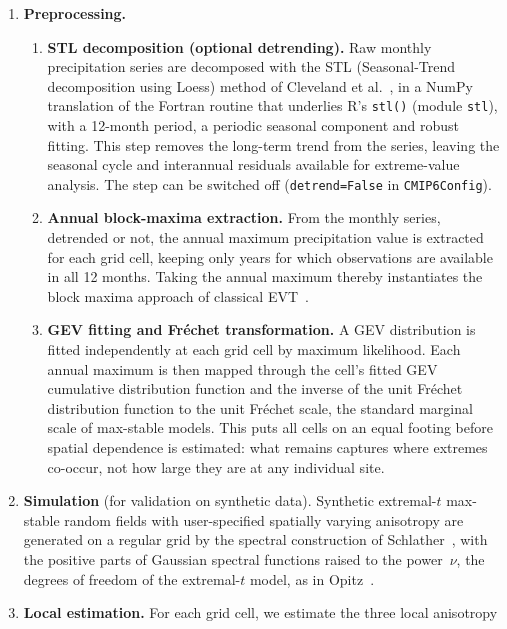 \documentclass[preprint,12pt,a4paper]{elsarticle}
\begin{document}
\begin{enumerate}
\item \textbf{Preprocessing.}
  \begin{enumerate}
  \item[\textbf{(a)}] \textbf{STL decomposition (optional detrending).}
    Raw monthly precipitation series are decomposed with the STL
    (Seasonal-Trend decomposition using Loess) method of Cleveland
    et al.~\cite{cleveland1990}, in a NumPy translation of the
    Fortran routine that underlies R's \texttt{stl()} (module
    \texttt{stl}), with a 12-month period, a periodic seasonal
    component and robust fitting. This
    step removes the long-term trend from the series,
    leaving the seasonal cycle and interannual residuals available for
    extreme-value analysis. The step can be
    switched off (\texttt{detrend=False} in \texttt{CMIP6Config}).
  \item[\textbf{(b)}] \textbf{Annual block-maxima extraction.}
    From the monthly series, detrended or not, the annual maximum
    precipitation value is extracted for each grid cell, keeping
    only years for which observations are available in all 12 months.
    Taking the
    annual maximum thereby instantiates the block maxima
    approach of classical EVT~\cite{dehaan2006}.
  \item[\textbf{(c)}] \textbf{GEV fitting and Fr\'{e}chet
    transformation.}
    A GEV distribution is fitted independently at each grid cell
    by maximum likelihood. Each annual maximum is then mapped
    through the cell's fitted GEV cumulative distribution function and
    the inverse of the unit Fr\'{e}chet distribution function to the
    unit Fr\'{e}chet scale, the standard marginal scale of
    max-stable models.
    This puts all cells on an equal footing before spatial
    dependence is estimated: what remains captures where extremes
    co-occur, not how large they are at any individual site.
  \end{enumerate}
\item \textbf{Simulation} (for validation on synthetic data).
  Synthetic extremal-$t$ max-stable random fields with
  user-specified spatially varying anisotropy are generated on a
  regular grid by the spectral construction of
  Schlather~\cite{schlather2002}, with the positive parts of
  Gaussian spectral functions raised to the power~$\nu$, the degrees
  of freedom of the extremal-$t$ model, as in Opitz~\cite{opitz2013}.
\item \textbf{Local estimation.}
  For each grid cell, we estimate the three local anisotropy

\end{enumerate}
\end{document}
